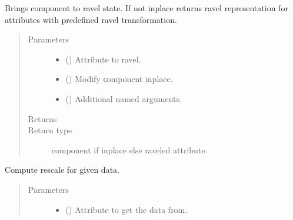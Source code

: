 \documentclass[letterpaper,10pt,english]{sphinxmanual}
\begin{document}
\begin{fulllineitems}
\begin{fulllineitems}
\label{\detokenize{api/rock:geology.src.Rock.ravel}}
Brings component to ravel state. If not inplace returns
ravel representation for attributes with pre\sphinxhyphen{}defined ravel transformation.
\begin{quote}\begin{description}
\item[{Parameters}] \leavevmode\begin{itemize}
\item {} 
 (\sphinxstyleliteralemphasis{\sphinxupquote{, }}) \textendash{} Attribute to ravel.

\item {} 
 () \textendash{} Modify сomponent inplace.

\item {} 
 () \textendash{} Additional named arguments.

\end{itemize}

\item[{Returns}] \leavevmode
{}

\item[{Return type}] \leavevmode
component if inplace else raveled attribute.

\end{description}\end{quote}

\end{fulllineitems}


\begin{fulllineitems}
\label{\detokenize{api/rock:geology.src.Rock.rescale}}
Compute rescale for given data.
\begin{quote}\begin{description}
\item[{Parameters}] \leavevmode\begin{itemize}
\item {} 
 (\sphinxstyleliteralemphasis{\sphinxupquote{, }}) \textendash{} Attribute to get the data from.


\end{itemize}
\end{description}
\end{quote}
\end{fulllineitems}
\end{fulllineitems}
\end{document}
